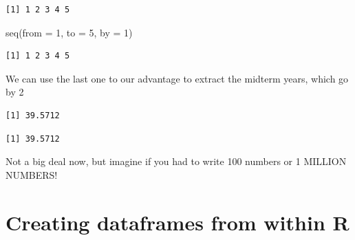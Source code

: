 \documentclass[
  letterpaper,
  DIV=11,
  numbers=noendperiod]{scrreprt}
\newenvironment{Shaded}{\begin{snugshade}}{\end{snugshade}}
\newcommand{\AttributeTok}[1]{\textcolor[rgb]{0.40,0.45,0.13}{#1}}
\newcommand{\CommentTok}[1]{\textcolor[rgb]{0.37,0.37,0.37}{#1}}
\newcommand{\DecValTok}[1]{\textcolor[rgb]{0.68,0.00,0.00}{#1}}
\newcommand{\FunctionTok}[1]{\textcolor[rgb]{0.28,0.35,0.67}{#1}}
\newcommand{\NormalTok}[1]{\textcolor[rgb]{0.00,0.23,0.31}{#1}}
\newcommand{\SpecialCharTok}[1]{\textcolor[rgb]{0.37,0.37,0.37}{#1}}
\begin{document}
\begin{verbatim}
[1] 1 2 3 4 5
\end{verbatim}

\begin{Shaded}
\begin{Highlighting}[]
\FunctionTok{seq}\NormalTok{(}\AttributeTok{from =} \DecValTok{1}\NormalTok{, }\AttributeTok{to =} \DecValTok{5}\NormalTok{, }\AttributeTok{by =} \DecValTok{1}\NormalTok{)}
\end{Highlighting}
\end{Shaded}

\begin{verbatim}
[1] 1 2 3 4 5
\end{verbatim}

We can use the last one to our advantage to extract the midterm years,
which go by 2

\begin{Shaded}
\end{Shaded}

\begin{verbatim}
[1] 39.5712
\end{verbatim}

\begin{Shaded}
\end{Shaded}

\begin{verbatim}
[1] 39.5712
\end{verbatim}

Not a big deal now, but imagine if you had to write 100 numbers or 1
MILLION NUMBERS!

\hypertarget{creating-dataframes-from-within-r}{%
\section{Creating dataframes from within
R}\label{creating-dataframes-from-within-r}}
\end{document}
